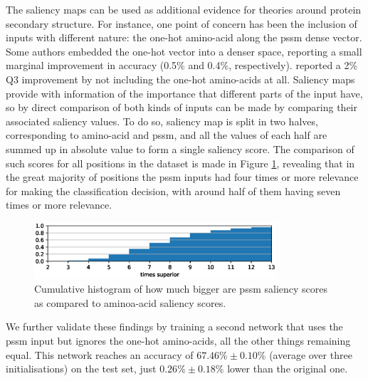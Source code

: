 \documentclass{article}
\begin{document}
The saliency maps can be used as additional evidence for theories around protein secondary structure. For instance, one point of concern has been the inclusion of inputs with different nature: the one-hot amino-acid along the pssm dense vector. Some authors \cite{Li2016,Zhou2018} embedded the one-hot vector into a denser space, reporting a small marginal improvement in accuracy (0.5\% and 0.4\%, respectively). \cite{Spencer2015} reported a 2\% Q3 improvement by not including the one-hot amino-acids at all. Saliency maps provide with information of the importance that different parts of the input have, so by direct comparison of both kinds of inputs can be made by comparing their associated saliency values. To do so, saliency map is split in two halves, corresponding to amino-acid and pssm, and all the values of each half are summed up in absolute value to form a single saliency score. The comparison of such scores for all positions in the dataset is made in Figure \ref{fig:aa_pssm}, revealing that in the great majority of positions the pssm inputs had four times or more relevance for making the classification decision, with around half of them having seven times or more relevance.
\begin{figure}
	\centering
	\centerline{\includegraphics[width=9cm]{aa_pssm}}
	\caption{Cumulative histogram of how much bigger are pssm saliency scores as compared to aminoa-acid saliency scores.}
	\label{fig:aa_pssm}
\end{figure}
We further validate these findings by training a second network that uses the pssm input but ignores the one-hot amino-acids, all the other things remaining equal. This network reaches an accuracy of $67.46\%\pm0.10\%$ (average over three initialisations) on the test set, just $0.26\%\pm0.18\%$ lower than the original one.
\end{document}
